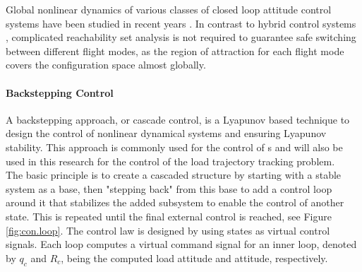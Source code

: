 Global nonlinear dynamics of various classes of closed loop attitude control systems have been studied in recent years \cite{Chaturvedi2011a}.
In contrast to hybrid control systems \cite{Gillula2010}, complicated reachability set analysis is not required to guarantee safe switching between different flight modes, as the region of attraction for each flight mode covers the configuration space almost globally.


\paragraph{Backstepping Control}\label{sec:con.back}
A backstepping approach, or cascade control, is a Lyapunov based technique to design the control of nonlinear dynamical systems and ensuring Lyapunov stability. 
This approach is commonly used for the control of s \cite{Mahony2012} and will also be used in this research for the control of the load trajectory tracking problem.\\
The basic principle is to create a cascaded structure by starting with a stable system as a base, then "stepping back" from this base to add a control loop around it that stabilizes the added subsystem to enable the control of another state. This is repeated until the final external control is reached, see Figure \ref{fig:con.loop}.
The control law is designed by using states as virtual control signals. Each loop computes a virtual command signal for an inner loop, denoted by $ q_c $ and $ R_c $, being the computed load attitude and  attitude, respectively.
%
